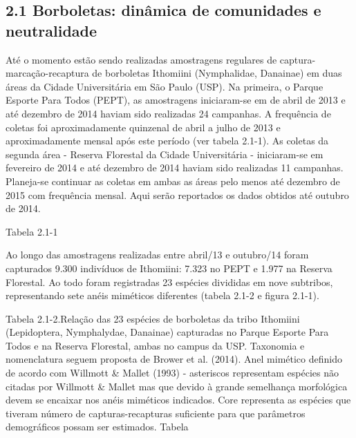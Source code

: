 \subsection{2.1 Borboletas: dinâmica de comunidades e neutralidade} %
\label{sec:dinamica-temporal-borb} 
Até o momento estão sendo realizadas amostragens regulares de captura-marcação-recaptura de borboletas Ithomiini (Nymphalidae, Danainae) em duas áreas da Cidade Universitária em São Paulo (USP). Na primeira, o Parque Esporte Para Todos (PEPT), as amostragens iniciaram-se em de abril de 2013 e até dezembro de 2014 haviam sido realizadas 24 campanhas. A frequência de coletas foi aproximadamente quinzenal de abril a julho de 2013 e aproximadamente mensal após este período (ver tabela 2.1-1). As coletas da segunda área - Reserva Florestal da Cidade Universitária - iniciaram-se em fevereiro de 2014 e até dezembro de 2014 haviam sido realizadas 11 campanhas. Planeja-se continuar as coletas em ambas as áreas pelo menos até dezembro de 2015 com frequência mensal. Aqui serão reportados os dados obtidos até outubro de 2014.



Tabela 2.1-1

Ao longo das amostragens realizadas entre abril/13 e outubro/14 foram capturados 9.300 indivíduos de Ithomiini: 7.323 no PEPT e 1.977 na Reserva Florestal. Ao todo foram registradas 23 espécies divididas em nove subtribos, representando sete anéis miméticos diferentes (tabela 2.1-2 e figura 2.1-1). 

Tabela 2.1-2.Relação das 23 espécies de borboletas da tribo Ithomiini (Lepidoptera, Nymphalydae, Danainae) capturadas no Parque Esporte Para Todos e na Reserva Florestal, ambas no campus da USP. Taxonomia e nomenclatura seguem proposta de Brower et al. (2014). Anel mimético definido de acordo com Willmott & Mallet (1993) - asteriscos representam espécies não citadas por Willmott & Mallet mas que devido à grande semelhança morfológica devem se encaixar nos anéis miméticos indicados. Core representa as espécies que tiveram número de capturas-recapturas suficiente para que parâmetros demográficos possam ser estimados.
Tabela





